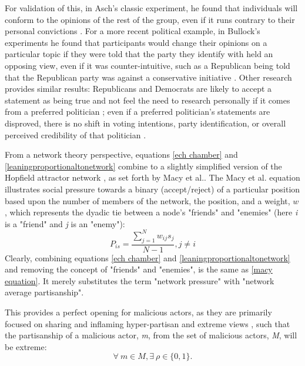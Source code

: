 \documentclass[preprint,review,12pt]{elsarticle}
\begin{document}
 For validation of this, in Asch's classic experiment, he found that individuals will conform to the opinions of the rest of the group, even if it runs contrary to their personal convictions \cite{asch1956studies}. For a more recent political example, in Bullock's experiments he found that participants would change their opinions on a particular topic if they were told that the party they identify with held an opposing view, even if it was counter-intuitive, such as a Republican being told that the Republican party was against a conservative initiative \cite{bullock2007experiments}. Other research provides similar results: Republicans and Democrats are likely to accept a statement as being true and not feel the need to research personally if it comes from a preferred politician \cite{housholder2014facebook}; even if a preferred politician's statements are disproved, there is no shift in voting intentions, party identification, or overall perceived credibility of that politician \cite{swire2017processing}. 
 
 From a network theory perspective, equations \ref{ech chamber} and \ref{leaningproportionaltonetwork} combine to a slightly simplified version of the Hopfield attractor network \cite{hopfield1982neural,hopfield1985neural,nowak1998toward,kitts1999structural}, as set forth by Macy et al.\cite{macy2003polarization}. The Macy et al. equation illustrates social pressure towards a binary (accept/reject) of a particular position based upon the number of members of the network, the position, and a weight, $w$, which represents the dyadic tie between a node's "friends" and "enemies" (here \textit{i} is a "friend" and \textit{j} is an "enemy"):
\begin{equation}
 \label{macy equation}
 P_{is}=\frac{\sum^{N}_{j=1}w_{ij}s_{j}}{N-1},j\neq i
\end{equation}
Clearly, combining equations \ref{ech chamber} and \ref{leaningproportionaltonetwork} and removing the concept of "friends" and "enemies", is the same as \ref{macy equation}. It merely substitutes the term "network pressure" with "network average partisanship".
 
 
This provides a perfect opening for malicious actors, as they are primarily focused on sharing and inflaming hyper-partisan and extreme views \cite{bastos2019brexit,hegelich2016social,mueller2019mueller}, such that the partisanship of a malicious actor, \textit{m}, from the set of malicious actors, \textit{M}, will be extreme: 
\begin{equation}
\label{trollpartisanship}
\forall \ m \in M, \exists \ \rho \in \{0,1\}.
\end{equation}
\end{document}
